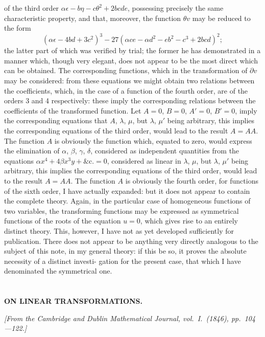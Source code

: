 \documentclass[11pt,a4paper]{article}
\theoremstyle{plain}
\theoremstyle{definition}
\theoremstyle{remark}
\begin{document}
of the third order $\alpha\epsilon - b\eta - c\theta^2 + 2bcde$, possessing precisely the same characteristic
property, and that, moreover, the function $\theta v$ may be reduced to the form
\[
(\alpha\epsilon - 4bd + 3c^2)^3 - 27(\alpha ce - \alpha d^2 - eb^2 - c^3 + 2bcd)^2;
\]
the latter part of which was verified by trial; the former he has demonstrated in a
manner which, though very elegant, does not appear to be the most direct which can
be obtained. The corresponding functions, which in the transformation of $\partial v$ may be
considered: from these equations we might obtain two relations between the
coefficients, which, in the case of a function of the fourth order, are of the orders 3
and 4 respectively: these imply the corresponding relations between the coefficients of
the transformed function. Let $A=0$, $B=0$, $A'=0$, $B'=0$, imply the corresponding equations
that $A$, $\lambda$, $\mu$, but $\lambda$, $\mu'$ being arbitrary, this implies the corresponding equations of
the third order, would lead to the result $A=AA$. The function $A$ is obviously the
function which, equated to zero, would express the elimination of $\alpha$, $\beta$, $\gamma$, $\delta$,
considered as independent quantities from the equations $\alpha x^4 + 4\beta x^3y + \&\text{c.} = 0$, considered as
linear in $\lambda$, $\mu$, but $\lambda$, $\mu'$ being arbitrary, this implies the corresponding equations of
the third order, would lead to the result $A=AA$. The function $A$ is obviously the
fourth order, for functions of the sixth order, I have actually expanded: but it does not
appear to contain the complete theory. Again, in the particular case of homogeneous
functions of two variables, the transforming functions may be expressed as symmetrical
functions of the roots of the equation $u=0$, which gives rise to an entirely distinct
theory. This, however, I have not as yet developed sufficiently for publication. There
does not appear to be anything very directly analogous to the subject of this note, in
my general theory: if this be so, it proves the absolute necessity of a distinct investi-
gation for the present case, that which I have denominated the symmetrical one.

\newpage
\setcounter{section}{13}


\section{}
\begin{center}
\textbf{ON LINEAR TRANSFORMATIONS.}
\end{center}
\textit{[From the Cambridge and Dublin Mathematical Journal, vol.\ I.\ (1846), pp.\ 104---122.]}
\end{document}
